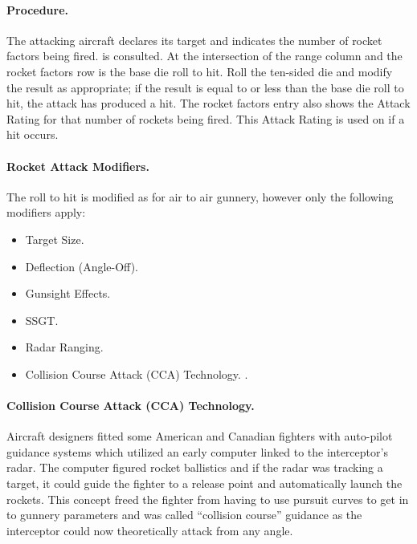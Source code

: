 \paragraph{Procedure.} The attacking aircraft declares its target and indicates the number of rocket factors being fired.  is consulted. At the intersection of the range column and the rocket factors row is the base die roll to hit. Roll the ten-sided die and modify the result as appropriate; if the result is equal to or less than the base die roll to hit, the attack has produced a hit. The rocket factors entry also shows the Attack Rating for that number of rockets being fired. This Attack Rating is used on  if a hit occurs.

\paragraph{Rocket Attack Modifiers.} The roll to hit is modified as for air to air gunnery, however only the following modifiers apply:

\begin{itemize}
    \item Target Size.
    \item Deflection (Angle-Off).
    \item Gunsight Effects.
    \item SSGT.
    \item Radar Ranging.
    \item Collision Course Attack (CCA) Technology.
    .
\end{itemize}

\paragraph{Collision Course Attack (CCA) Technology.} Aircraft designers fitted some American and Canadian fighters with auto-pilot guidance systems which utilized an early computer linked to the interceptor's radar. The computer figured rocket ballistics and if the radar was tracking a target, it could guide the fighter to a release point and automatically launch the rockets. This concept freed the fighter from having to use pursuit curves to get in to gunnery parameters and was called “collision course” guidance as the interceptor could now theoretically attack from any angle.

